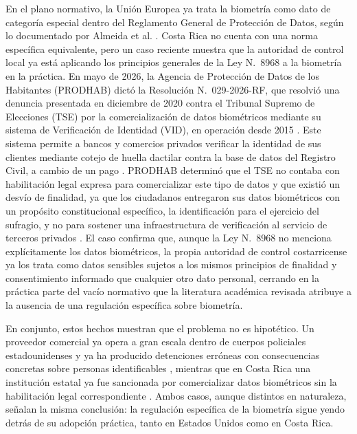 En el plano normativo, la Unión Europea ya trata la biometría como
dato de categoría especial dentro del Reglamento General de Protección
de Datos, según lo documentado por Almeida et al.
\cite{almeida_ethics_2022}. Costa Rica no cuenta con una norma
específica equivalente, pero un caso reciente muestra que la autoridad
de control local ya está aplicando los principios generales de la Ley
N.\textdegree{}~8968 a la biometría en la práctica. En mayo de 2026, la
Agencia de Protección de Datos de los Habitantes (PRODHAB) dictó la
Resolución N.\textdegree{}~029-2026-RF, que resolvió una denuncia
presentada en diciembre de 2020 contra el Tribunal Supremo de
Elecciones (TSE) por la comercialización de datos biométricos mediante
su sistema de Verificación de Identidad (VID), en operación desde
2015 \cite{lopez_prodhab_2026}. Este sistema permite a bancos y
comercios privados verificar la identidad de sus clientes mediante
cotejo de huella dactilar contra la base de datos del Registro Civil,
a cambio de un pago \cite{lopez_prodhab_2026}. PRODHAB determinó que
el TSE no contaba con habilitación legal expresa para comercializar
este tipo de datos y que existió un desvío de finalidad, ya que los
ciudadanos entregaron sus datos biométricos con un propósito
constitucional específico, la identificación para el ejercicio del
sufragio, y no para sostener una infraestructura de verificación al
servicio de terceros privados \cite{lopez_prodhab_2026}. El caso
confirma que, aunque la Ley N.\textdegree{}~8968 no menciona
explícitamente los datos biométricos, la propia autoridad de control
costarricense ya los trata como datos sensibles sujetos a los mismos
principios de finalidad y consentimiento informado que cualquier otro
dato personal, cerrando en la práctica parte del vacío normativo que
la literatura académica revisada atribuye a la ausencia de una
regulación específica sobre biometría.

En conjunto, estos hechos muestran que el problema no es hipotético.
Un proveedor comercial ya opera a gran escala dentro de cuerpos
policiales estadounidenses y ya ha producido detenciones erróneas con
consecuencias concretas sobre personas identificables
\cite{cnn_lipps_2026,biometricupdate_reid_2025}, mientras que en Costa
Rica una institución estatal ya fue sancionada por comercializar datos
biométricos sin la habilitación legal correspondiente
\cite{lopez_prodhab_2026}. Ambos casos, aunque distintos en
naturaleza, señalan la misma conclusión: la regulación específica de
la biometría sigue yendo detrás de su adopción práctica, tanto en
Estados Unidos como en Costa Rica.